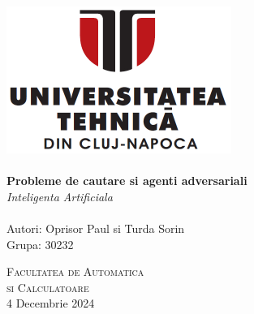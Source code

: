 \begin{titlepage}
\begin{center}

\includegraphics[width=0.55\textwidth]{resources/utcn_logo.jpg}~\\[2cm]

\HRule \\[0.4cm]
{ \LARGE
    \textbf{Probleme de cautare si agenti adversariali}\\[0.4cm]
    \emph{Inteligenta Artificiala}\\[0.4cm]
}
\HRule \\[1.5cm]

{ \large
    Autori: Oprisor Paul si Turda Sorin\\[0.1cm]
    Grupa: 30232\\[0.1cm]
}

\vfill
\textsc{\large Facultatea de Automatica\\si Calculatoare}\\[0.4cm]

{\large 4 Decembrie 2024}
    
\end{center}
\end{titlepage}